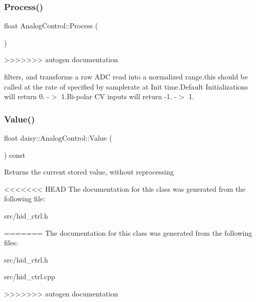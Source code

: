 \subsubsection{\texorpdfstring{Process()}{Process()}}
{\footnotesize\ttfamily float Analog\+Control\+::\+Process (\begin{DoxyParamCaption}{ }\end{DoxyParamCaption})}
>>>>>>> autogen documentation

filters, and transforms a raw A\+DC read into a normalized range.\+this should be called at the rate of specified by samplerate at Init time.\+Default Initializations will return 0. -\/$>$ 1.\+Bi-\/polar CV inputs will return -\/1. -\/$>$ 1. \mbox{\label{classdaisy_1_1_analog_control_a099ff147f24ae2220921d22729a66020}} 
\subsubsection{\texorpdfstring{Value()}{Value()}}
{\footnotesize\ttfamily float daisy\+::\+Analog\+Control\+::\+Value (\begin{DoxyParamCaption}{ }\end{DoxyParamCaption}) const\hspace{0.3cm}{\ttfamily [inline]}}

Returns the current stored value, without reprocessing 

<<<<<<< HEAD
The documentation for this class was generated from the following file\+:\begin{DoxyCompactItemize}
\item 
src/hid\+\_\+ctrl.\+h\end{DoxyCompactItemize}
=======
The documentation for this class was generated from the following files\+:\begin{DoxyCompactItemize}
\item 
src/hid\+\_\+ctrl.\+h\item 
src/hid\+\_\+ctrl.\+cpp\end{DoxyCompactItemize}
>>>>>>> autogen documentation
